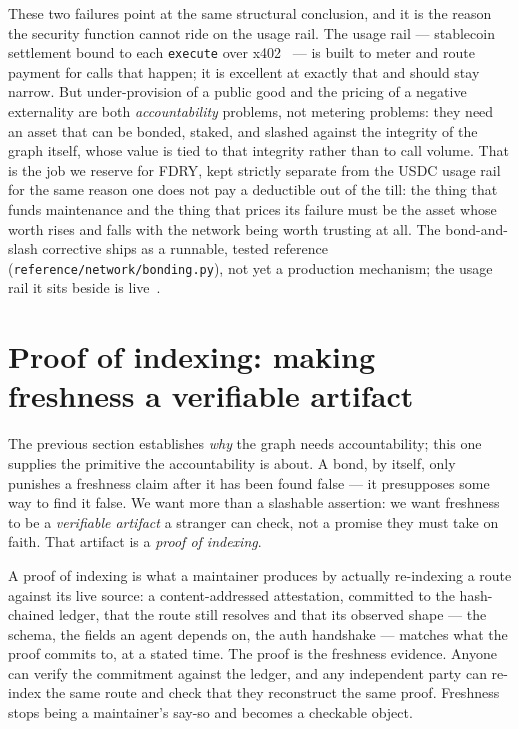 \documentclass[11pt]{article}
\begin{document}
These two failures point at the same structural conclusion, and it is the reason
the security function cannot ride on the usage rail. The usage rail --- stablecoin
settlement bound to each \texttt{execute} over x402~\cite{x402} --- is built to
meter and route payment for calls that happen; it is excellent at exactly that and
should stay narrow. But under-provision of a public good and the pricing of a
negative externality are both \emph{accountability} problems, not metering
problems: they need an asset that can be bonded, staked, and slashed against the
integrity of the graph itself, whose value is tied to that integrity rather than
to call volume. That is the job we reserve for FDRY, kept
strictly separate from the USDC usage rail for the same reason one does not pay a
deductible out of the till: the thing that funds maintenance and the thing that
prices its failure must be the asset whose worth rises and falls with the network
being worth trusting at all. The bond-and-slash corrective ships as
a runnable, tested reference (\texttt{reference/network/bonding.py}), not yet a
production mechanism; the usage rail it sits beside is live~\cite{x402}.

\section{Proof of indexing: making freshness a verifiable artifact}

The previous section establishes \emph{why} the graph needs accountability; this
one supplies the primitive the accountability is about. A bond, by itself, only
punishes a freshness claim after it has been found false --- it presupposes some way
to find it false. We want more than a slashable assertion: we want freshness to be
a \emph{verifiable artifact} a stranger can check, not a promise they must take on
faith. That artifact is a \emph{proof of indexing}.

A proof of indexing is what a maintainer produces by actually re-indexing a route
against its live source: a content-addressed attestation, committed to the
hash-chained ledger, that the route still resolves and that its observed shape ---
the schema, the fields an agent depends on, the auth handshake --- matches what the
proof commits to, at a stated time. The proof is the freshness evidence. Anyone can
verify the commitment against the ledger, and any independent party can re-index the
same route and check that they reconstruct the same proof. Freshness stops being a
maintainer's say-so and becomes a checkable object.
\end{document}

